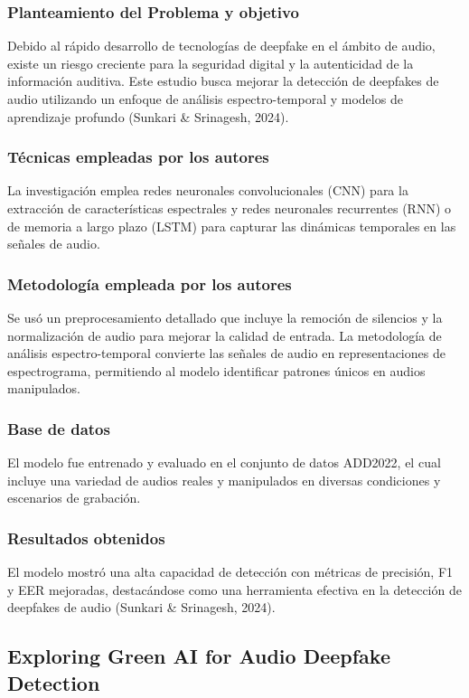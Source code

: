 \subsubsection{Planteamiento del Problema y objetivo }
Debido al rápido desarrollo de tecnologías de deepfake en el ámbito de audio, existe un riesgo creciente para la seguridad digital y la autenticidad de la información auditiva. Este estudio busca mejorar la detección de deepfakes de audio utilizando un enfoque de análisis espectro-temporal y modelos de aprendizaje profundo (Sunkari \& Srinagesh, 2024).

\subsubsection{Técnicas empleadas por los autores}
La investigación emplea redes neuronales convolucionales (CNN) para la extracción de características espectrales y redes neuronales recurrentes (RNN) o de memoria a largo plazo (LSTM) para capturar las dinámicas temporales en las señales de audio.

\subsubsection{Metodología empleada por los autores}
Se usó un preprocesamiento detallado que incluye la remoción de silencios y la normalización de audio para mejorar la calidad de entrada. La metodología de análisis espectro-temporal convierte las señales de audio en representaciones de espectrograma, permitiendo al modelo identificar patrones únicos en audios manipulados.

\subsubsection{Base de datos}
El modelo fue entrenado y evaluado en el conjunto de datos ADD2022, el cual incluye una variedad de audios reales y manipulados en diversas condiciones y escenarios de grabación.

\subsubsection{Resultados obtenidos}
El modelo mostró una alta capacidad de detección con métricas de precisión, F1 y EER mejoradas, destacándose como una herramienta efectiva en la detección de deepfakes de audio (Sunkari \& Srinagesh, 2024).

\subsection{Exploring Green AI for Audio Deepfake Detection \citep*{pr_dehghani2018copper}}

